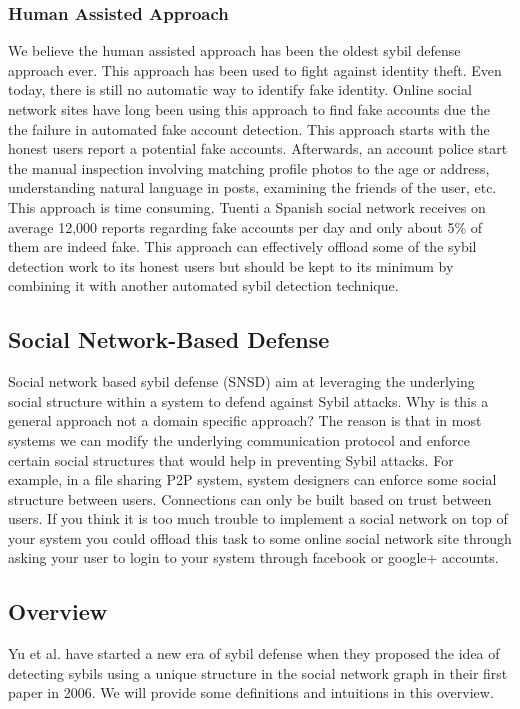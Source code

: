 \documentclass[conference]{IEEEtran}
\begin{document}
\subsubsection{Human Assisted Approach}
We believe the human assisted approach has been the oldest sybil defense approach ever. 
This approach has been used to fight against identity theft. Even today, there is still no automatic way to identify fake identity. 
Online social network sites have long been using this approach to find fake accounts due the the failure in automated fake account detection. 
This approach starts with the honest users report a potential fake accounts. 
Afterwards, an account police start the manual inspection involving matching profile photos to the age or address, understanding natural language in posts, 
examining the friends of the user, etc. 
This approach is time consuming. 
Tuenti a Spanish social network receives on average 12,000 reports regarding fake accounts per day and only about 5\% of them are indeed fake. 
This approach can effectively offload some of the sybil detection work to its honest users but should be kept to its minimum by combining it with another 
automated sybil detection technique.

\subsection{Social Network-Based Defense}
Social network based sybil defense (SNSD) aim at leveraging the underlying social structure within a system to defend against Sybil attacks. Why is this a general approach not a domain specific approach? The reason is that in most systems we can modify the underlying communication protocol and enforce certain social structures that would help in preventing Sybil attacks. For example, in a file sharing P2P system, system designers can enforce some social structure between users. Connections can only be built based on trust between users. If you think it is too much trouble to implement a social network on top of your system you could offload this task to some online social network site through asking your user to login to your system through facebook or google+ accounts.

\subsection{Overview}
Yu et al. have started a new era of sybil defense when they proposed the idea of detecting sybils using a unique structure in the social network graph in their first paper \cite{Yu08SybilGuard} in 2006. We will provide some definitions and intuitions in this overview. 
\end{document}
